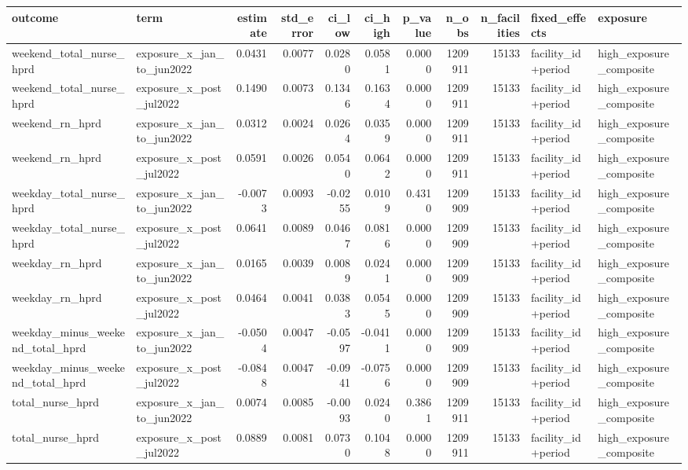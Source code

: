 \begin{tabular}{llrrrrrrrll}
\toprule
outcome & term & estimate & std_error & ci_low & ci_high & p_value & n_obs & n_facilities & fixed_effects & exposure \\
\midrule
weekend_total_nurse_hprd & exposure_x_jan_to_jun2022 & 0.0431 & 0.0077 & 0.0280 & 0.0581 & 0.0000 & 1209911 & 15133 & facility_id+period & high_exposure_composite \\
weekend_total_nurse_hprd & exposure_x_post_jul2022 & 0.1490 & 0.0073 & 0.1346 & 0.1634 & 0.0000 & 1209911 & 15133 & facility_id+period & high_exposure_composite \\
weekend_rn_hprd & exposure_x_jan_to_jun2022 & 0.0312 & 0.0024 & 0.0264 & 0.0359 & 0.0000 & 1209911 & 15133 & facility_id+period & high_exposure_composite \\
weekend_rn_hprd & exposure_x_post_jul2022 & 0.0591 & 0.0026 & 0.0540 & 0.0642 & 0.0000 & 1209911 & 15133 & facility_id+period & high_exposure_composite \\
weekday_total_nurse_hprd & exposure_x_jan_to_jun2022 & -0.0073 & 0.0093 & -0.0255 & 0.0109 & 0.4310 & 1209909 & 15133 & facility_id+period & high_exposure_composite \\
weekday_total_nurse_hprd & exposure_x_post_jul2022 & 0.0641 & 0.0089 & 0.0467 & 0.0816 & 0.0000 & 1209909 & 15133 & facility_id+period & high_exposure_composite \\
weekday_rn_hprd & exposure_x_jan_to_jun2022 & 0.0165 & 0.0039 & 0.0089 & 0.0241 & 0.0000 & 1209909 & 15133 & facility_id+period & high_exposure_composite \\
weekday_rn_hprd & exposure_x_post_jul2022 & 0.0464 & 0.0041 & 0.0383 & 0.0545 & 0.0000 & 1209909 & 15133 & facility_id+period & high_exposure_composite \\
weekday_minus_weekend_total_hprd & exposure_x_jan_to_jun2022 & -0.0504 & 0.0047 & -0.0597 & -0.0411 & 0.0000 & 1209909 & 15133 & facility_id+period & high_exposure_composite \\
weekday_minus_weekend_total_hprd & exposure_x_post_jul2022 & -0.0848 & 0.0047 & -0.0941 & -0.0756 & 0.0000 & 1209909 & 15133 & facility_id+period & high_exposure_composite \\
total_nurse_hprd & exposure_x_jan_to_jun2022 & 0.0074 & 0.0085 & -0.0093 & 0.0240 & 0.3861 & 1209911 & 15133 & facility_id+period & high_exposure_composite \\
total_nurse_hprd & exposure_x_post_jul2022 & 0.0889 & 0.0081 & 0.0730 & 0.1048 & 0.0000 & 1209911 & 15133 & facility_id+period & high_exposure_composite \\

\end{tabular}
